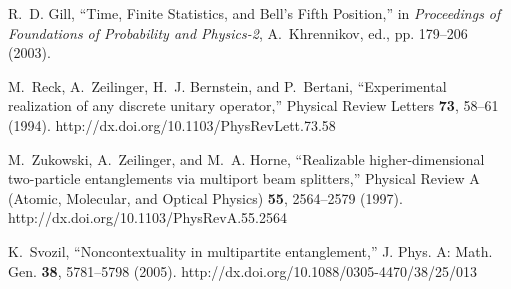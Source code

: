 \documentclass[rmp,amsfonts,showpacs,showkeys,preprint]{revtex4}
\begin{document}
\begin{thebibliography}{10}
R.~D. Gill, \enquote{Time, Finite Statistics, and {B}ell's Fifth Position,} in
  {\em Proceedings of Foundations of Probability and Physics-2\/},
  A.~Khrennikov, ed.,  pp. 179--206 (2003).

M.~Reck, A.~Zeilinger, H.~J. Bernstein, and P.~Bertani, \enquote{Experimental
  realization of any discrete unitary operator,} Physical Review Letters {\bf
  73}, 58--61 (1994).
\newline http://dx.doi.org/10.1103/PhysRevLett.73.58

M.~Zukowski, A.~Zeilinger, and M.~A. Horne, \enquote{Realizable
  higher-dimensional two-particle entanglements via multiport beam splitters,}
  Physical Review A (Atomic, Molecular, and Optical Physics) {\bf 55},
  2564--2579 (1997).
\newline http://dx.doi.org/10.1103/PhysRevA.55.2564

K.~Svozil, \enquote{Noncontextuality in multipartite entanglement,} J. Phys. A:
  Math. Gen. {\bf 38}, 5781--5798 (2005).
\newline http://dx.doi.org/10.1088/0305-4470/38/25/013

\end{thebibliography}
\end{document}
